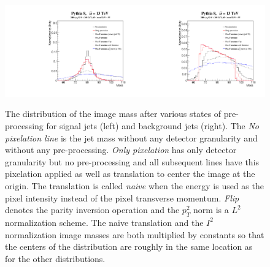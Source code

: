 \begin{figure}[htbp!]
  \begin{center}
        \includegraphics[width=0.5\textwidth]{figures/ImageMass_Comparison.pdf}\includegraphics[width=0.5\textwidth]{figures/ImageMass_Comparison_back.pdf}
      \caption{ The distribution of the image mass after various states of pre-processing for signal jets (left) and background jets (right).  The {\it No pixelation line} is the jet mass without any detector granularity and without any pre-processing.  {\it Only pixelation} has only detector granularity but no pre-processing and all subsequent lines have this pixelation applied as well as translation to center the image at the origin.  The translation is called {\it naive} when the energy is used as the pixel intensity instead of the pixel transverse momentum.  {\it Flip} denotes the parity inversion operation and the $p_T^2$ norm is a $L^2$ normalization scheme.  The naive translation and the $I^2$ normalization image masses are both multiplied by constants so that the centers of the distribution are roughly in the same location as for the other distributions.
      \label{fig:preprocess2} }
    \end{center}
\end{figure}



